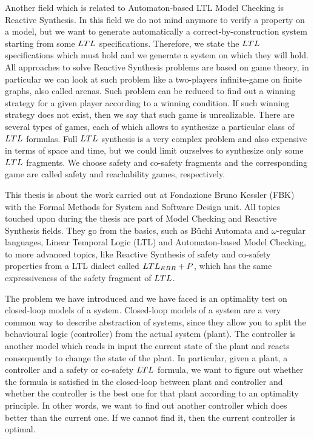 Another field which is related to Automaton-based LTL Model Checking is Reactive Synthesis. 
In this field we do not mind anymore to verify a property on a model, but we want to generate automatically a correct-by-construction system starting from some $LTL$ specifications.
Therefore, we state the $LTL$ specifications which must hold and we generate a system on which they will hold.
All approaches to solve Reactive Synthesis problems are based on game theory, in particular we can look at such problem like a two-players infinite-game on finite graphs, also called arenas. 
Such problem can be reduced to find out a winning strategy for a given player according to a winning condition. If such winning strategy does not exist, then we say that such game is unrealizable.
There are several types of games, each of which allows to synthesize a particular class of $LTL$ formulas.  
Full $LTL$ synthesis is a very complex problem and also expensive in terms of space and time, but we could limit ourselves to synthesize only some $LTL$ fragments. 
We choose safety and co-safety fragments and the corresponding game are called safety and reachability games, respectively.

This thesis is about the work carried out at Fondazione Bruno Kessler (FBK) with the Formal Methods for System and Software Design unit.
All topics touched upon during the thesis are part of Model Checking and Reactive Synthesis fields. They go from the basics, such as B\"uchi Automata and $\omega$-regular languages, Linear Temporal Logic (LTL) and Automaton-based Model Checking, to more advanced topics, like Reactive Synthesis of safety and co-safety properties from a LTL dialect called $LTL_{EBR}+P$, which has the same expressiveness of the safety fragment of $LTL$.

The problem we have introduced and we have faced is an optimality test on closed-loop models of a system.
Closed-loop models of a system are a very common way to describe abstraction of systems, since they allow you to split the behavioural logic (controller) from the actual system (plant). The controller is another model which reads in input the current state of the plant and reacts consequently to change the state of the plant.
In particular, given a plant, a controller and a safety or co-safety $LTL$ formula, we want to figure out whether the formula is satisfied in the closed-loop between plant and controller and whether the controller is the best one for that plant according to an optimality principle.
In other words, we want to find out another controller which does better than the current one.
If we cannot find it, then the current controller is optimal.

